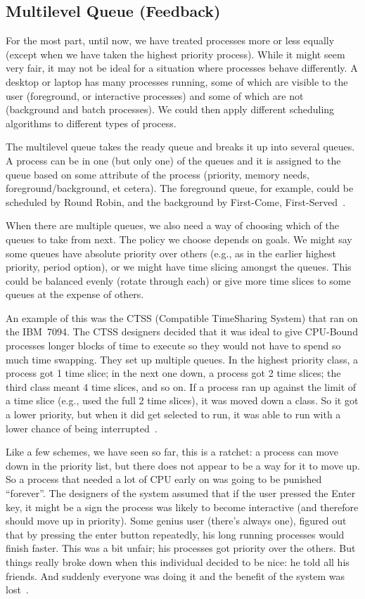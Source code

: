 \subsection*{Multilevel Queue (Feedback)}
For the most part, until now, we have treated processes more or less equally (except when we have taken the highest priority process). While it might seem very fair, it may not be ideal for a situation where processes behave differently. A desktop or laptop has many processes running, some of which are visible to the user (foreground, or interactive processes) and some of which are not (background and batch processes). We could then apply different scheduling algorithms to different types of process.

The multilevel queue takes the ready queue and breaks it up into several queues. A process can be in one (but only one) of the queues and it is assigned to the queue based on some attribute of the process (priority, memory needs, foreground/background, et cetera). The foreground queue, for example, could be scheduled by Round Robin, and the background by First-Come, First-Served~\cite{osc}.

When there are multiple queues, we also need a way of choosing which of the queues to take from next. The policy we choose depends on goals. We might say some queues have absolute priority over others (e.g., as in the earlier highest priority, period option), or we might have time slicing amongst the queues. This could be balanced evenly (rotate through each) or give more time slices to some queues at the expense of others.

An example of this was the CTSS (Compatible TimeSharing System) that ran on the IBM~7094. The CTSS designers decided that it was ideal to give CPU-Bound processes longer blocks of time to execute so they would not have to spend so much time swapping. They set up multiple queues. In the highest priority class, a process got 1 time slice; in the next one down, a process got 2 time slices; the third class meant 4 time slices, and so on. If a process ran up against the limit of a time slice (e.g., used the full 2 time slices), it was moved down a class. So it got a lower priority, but when it did get selected to run, it was able to run with a lower chance of being interrupted~\cite{mos}.

Like a few schemes, we have seen so far, this is a ratchet: a process can move down in the priority list, but there does not appear to be a way for it to move up. So a process that needed a lot of CPU early on was going to be punished ``forever''. The designers of the system assumed that if the user pressed the Enter key, it might be a sign the process was likely to become interactive (and therefore should move up in priority). Some genius user (there's always one), figured out that by pressing the enter button repeatedly, his long running processes would finish faster. This was a bit unfair; his processes got priority over the others. But things really broke down when this individual decided to be nice: he told all his friends. And suddenly everyone was doing it and the benefit of the system was lost~\cite{mos}.

